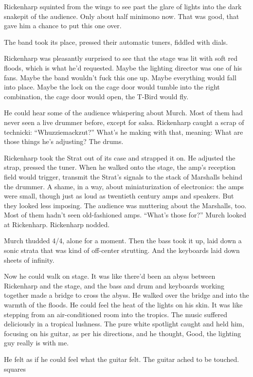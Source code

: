 Rickenharp squinted from the wings to see past the glare of lights into the dark snakepit of the audience. Only about half minimono now. That was good, that gave him a chance to put this one over.

The band took its place, pressed their automatic tuners, fiddled with dials.

Rickenharp was pleasantly surprised to see that the stage was lit with soft red floods, which is what he’d requested. Maybe the lighting director was one of his fans. Maybe the band wouldn’t fuck this one up. Maybe everything would fall into place. Maybe the lock on the cage door would tumble into the right combination, the cage door would open, the T-Bird would fly.

He could hear some of the audience whispering about Murch. Most of them had never seen a live drummer before, except for salsa. Rickenharp caught a scrap of technicki: “Whuzziemackzut?” What’s he making with that, meaning: What are those things he’s adjusting? The drums.

Rickenharp took the Strat out of its case and strapped it on. He adjusted the strap, pressed the tuner. When he walked onto the stage, the amp’s reception field would trigger, transmit the Strat’s signals to the stack of Marshalls behind the drummer. A shame, in a way, about miniaturization of electronics: the amps were small, though just as loud as twentieth century amps and speakers. But they looked less imposing. The audience was muttering about the Marshalls, too. Most of them hadn’t seen old-fashioned amps. “What’s those for?” Murch looked at Rickenharp. Rickenharp nodded.

Murch thudded 4/4, alone for a moment. Then the bass took it up, laid down a sonic strata that was kind of off-center strutting. And the keyboards laid down sheets of infinity.

Now he could walk on stage. It was like there’d been an abyss between Rickenharp and the stage, and the bass and drum and keyboards working together made a bridge to cross the abyss. He walked over the bridge and into the warmth of the floods. He could feel the heat of the lights on his skin. It was like stepping from an air-conditioned room into the tropics. The music suffered deliciously in a tropical lushness. The pure white spotlight caught and held him, focusing on his guitar, as per his directions, and he thought, Good, the lighting guy really is with me.

He felt as if he could feel what the guitar felt. The guitar ached to be touched.
squares

